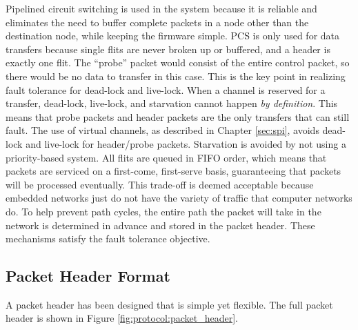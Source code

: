 Pipelined circuit switching is used in the system because it is reliable and eliminates the need to buffer complete packets in a node other than the destination node, while keeping the firmware simple. PCS is only used for data transfers because single flits are never broken up or buffered, and a header is exactly one flit. The ``probe'' packet would consist of the entire control packet, so there would be no data to transfer in this case. This is the key point in realizing fault tolerance for dead-lock and live-lock. When a channel is reserved for a transfer, dead-lock, live-lock, and starvation cannot happen \emph{by definition}. This means that probe packets and header packets are the only transfers that can still fault. The use of virtual channels, as described in Chapter \ref{sec:spi}, avoids dead-lock and live-lock for header/probe packets. Starvation is avoided by not using a priority-based system. All flits are queued in FIFO order, which means that packets are serviced on a first-come, first-serve basis, guaranteeing that packets will be processed eventually. This trade-off is deemed acceptable because embedded networks just do not have the variety of traffic that computer networks do. To help prevent path cycles, the entire path the packet will take in the network is determined in advance and stored in the packet header. These mechanisms satisfy the fault tolerance objective.

\subsection{Packet Header Format}\label{sec:protocol:methodology:header_format}

 A packet header has been designed that is simple yet flexible. The full packet header is shown in Figure \ref{fig:protocol:packet_header}.

